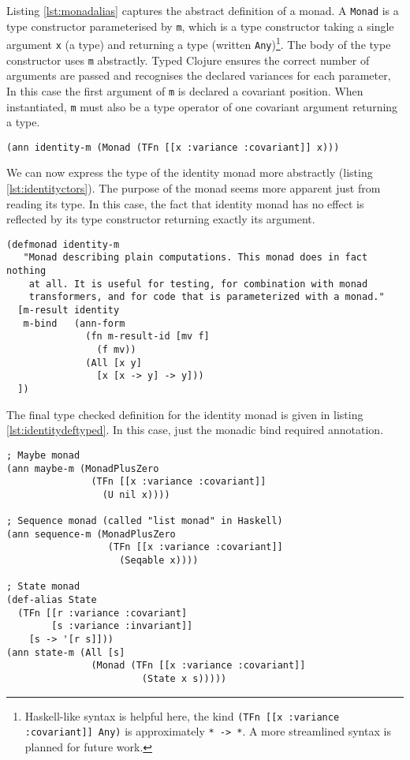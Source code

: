 Listing \ref{lst:monadalias} captures the abstract definition of a monad.
A \lstinline|Monad| is a type constructor parameterised by \lstinline|m|, which is
a type constructor taking a single argument \lstinline|x| (a type) and returning a type 
(written \lstinline|Any|)\footnote{Haskell-like syntax is helpful here, the kind \lstinline|(TFn [[x :variance :covariant]] Any)|
is approximately \lstinline|* -> *|. A more streamlined syntax is planned for future work.}.
The body of the type constructor uses \lstinline|m| abstractly. Typed Clojure
ensures the correct number of arguments are passed and recognises the declared variances
for each parameter, In this case the first argument of \lstinline|m| is declared
a covariant position. When instantiated, \lstinline|m| must also be a type operator
of one covariant argument returning a type.

\begin{lstlisting}[caption=Identity monad using user defined type constructors, label=lst:identityctors]
(ann identity-m (Monad (TFn [[x :variance :covariant]] x)))
\end{lstlisting}

We can now express the type of the identity monad more abstractly (listing \ref{lst:identityctors}).
The purpose of the monad seems more apparent just from reading its type.
In this case, the fact that identity monad has no effect is reflected
by its type constructor returning exactly its argument.

\begin{lstlisting}[caption=Type checked identity monad definition, label=lst:identitydeftyped]
(defmonad identity-m
   "Monad describing plain computations. This monad does in fact nothing
    at all. It is useful for testing, for combination with monad
    transformers, and for code that is parameterized with a monad."
  [m-result identity
   m-bind   (ann-form
              (fn m-result-id [mv f]
                (f mv))
              (All [x y]
                [x [x -> y] -> y]))
  ])
\end{lstlisting}

The final type checked definition for the identity monad is given in listing \ref{lst:identitydeftyped}.
In this case, just the monadic bind required annotation.

\begin{lstlisting}[caption=Several monad types, label=lst:severalmonads]
; Maybe monad
(ann maybe-m (MonadPlusZero
               (TFn [[x :variance :covariant]] 
                 (U nil x))))

; Sequence monad (called "list monad" in Haskell)
(ann sequence-m (MonadPlusZero 
                  (TFn [[x :variance :covariant]]
                    (Seqable x))))

; State monad
(def-alias State
  (TFn [[r :variance :covariant]
        [s :variance :invariant]]
    [s -> '[r s]]))
(ann state-m (All [s]
               (Monad (TFn [[x :variance :covariant]]
                        (State x s)))))
\end{lstlisting}

